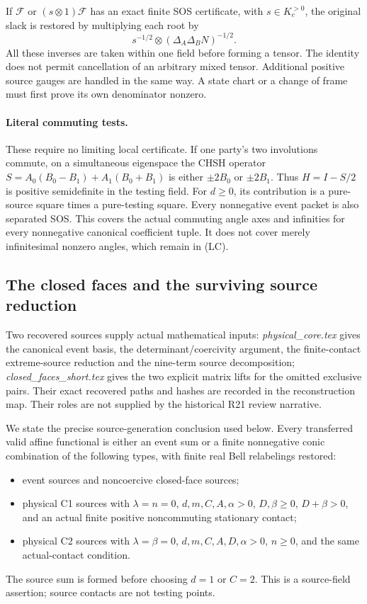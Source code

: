 If $\mathcal F$ or $(s\otimes1)\mathcal F$ has an exact finite SOS
certificate, with $s\in K_c^{>0}$, the original slack is restored by
multiplying each root by
\[
 s^{-1/2}\otimes(\Delta_A\Delta_BN)^{-1/2}.
 \tag{RFA13}
\]
All these inverses are taken within one field before forming a tensor.
The identity does not permit cancellation of an arbitrary mixed tensor.
Additional positive source gauges are handled in the same way. A state
chart or a change of frame must first prove its own denominator nonzero.

\paragraph{Literal commuting tests.}
These require no limiting local certificate. If one party's two
involutions commute, on a simultaneous eigenspace the CHSH operator
$S=A_0(B_0-B_1)+A_1(B_0+B_1)$ is either $\pm2B_0$ or $\pm2B_1$.
Thus $H=I-S/2$ is positive semidefinite in the testing field. For
$d\geq0$, its contribution is a pure-source square times a
pure-testing square. Every nonnegative event packet is also separated
SOS. This covers the actual commuting angle axes and infinities for
every nonnegative canonical coefficient tuple. It does not cover merely
infinitesimal nonzero angles, which remain in (LC).

\subsection{The closed faces and the surviving source reduction}

Two recovered sources supply actual mathematical inputs:
\emph{physical\_core.tex} gives the canonical event basis, the
determinant/coercivity argument, the finite-contact extreme-source
reduction and the nine-term source decomposition;
\emph{closed\_faces\_short.tex} gives the two explicit matrix lifts
for the omitted exclusive pairs. Their exact recovered paths and hashes
are recorded in the reconstruction map. Their roles are not supplied
by the historical R21 review narrative.

We state the precise source-generation conclusion used below. Every
transferred valid affine functional is either an event sum or a finite
nonnegative conic combination of the following types, with finite real
Bell relabelings restored:
\begin{itemize}
\item event sources and noncoercive closed-face sources;
\item physical C1 sources with $\lambda=n=0$, $d,m,C,A,\alpha>0$,
      $D,\beta\geq0$, $D+\beta>0$, and an actual finite positive
      noncommuting stationary contact;
\item physical C2 sources with $\lambda=\beta=0$,
      $d,m,C,A,D,\alpha>0$, $n\geq0$, and the same actual-contact
      condition.
\end{itemize}
The source sum is formed before choosing $d=1$ or $C=2$.
This is a source-field assertion; source contacts are not testing points.

